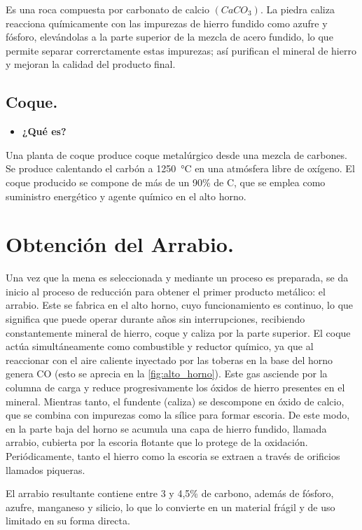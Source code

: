 \documentclass[12pt,a4paper]{article}
\begin{document}
Es una roca compuesta por carbonato de calcio $(CaCO_3)$. La piedra caliza reacciona químicamente con las impurezas de hierro fundido como azufre y fósforo, elevándolas a la parte superior de la mezcla de acero fundido, lo que permite separar correrctamente estas impurezas; así purifican el mineral de hierro y mejoran la calidad del producto final.

\subsection{Coque.}
\begin{itemize}
    \item \textbf{¿Qué es?}
\end{itemize}

Una planta de coque produce coque metalúrgico desde una mezcla de carbones. Se produce calentando el carbón a \SI{1250}{\celsius} en una atmósfera libre de oxígeno. El coque producido se compone de más de un 90\% de C, que se emplea como suministro energético y agente químico en el alto horno.

\section{Obtención del Arrabio.}

Una vez que la mena es seleccionada y mediante un proceso es preparada, se da inicio al proceso de reducción para obtener el primer producto metálico: el arrabio. Este se fabrica en el alto horno, cuyo funcionamiento es continuo, lo que significa que puede operar durante años sin interrupciones, recibiendo constantemente mineral de hierro, coque y caliza por la parte superior. El coque actúa simultáneamente como combustible y reductor químico, ya que al reaccionar con el aire caliente inyectado por las toberas en la base del horno genera CO (esto se aprecia en la \autoref{fig:alto_horno}). Este gas asciende por la columna de carga y reduce progresivamente los óxidos de hierro presentes en el mineral. Mientras tanto, el fundente (caliza) se descompone en óxido de calcio, que se combina con impurezas como la sílice para formar escoria. De este modo, en la parte baja del horno se acumula una capa de hierro fundido, llamada arrabio, cubierta por la escoria flotante que lo protege de la oxidación. Periódicamente, tanto el hierro como la escoria se extraen a través de orificios llamados piqueras. 

El arrabio resultante contiene entre 3 y 4,5\% de carbono, además de fósforo, azufre, manganeso y silicio, lo que lo convierte en un material frágil y de uso limitado en su forma directa.
\end{document}
